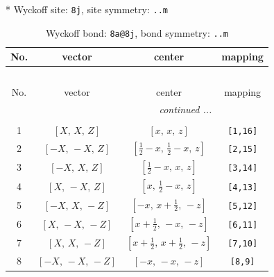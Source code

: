 \documentclass[fleqn,8pt]{jsarticle}
\begin{document}
* Wyckoff site: {\tt 8j}, site symmetry: {\tt ..m}
\renewcommand{\arraystretch}{1.2}
\begin{longtable}{cccc}
\caption{Wyckoff bond: {\tt 8a@8j}, bond symmetry: {\tt ..m}}
 \\
 \hline \hline
No. & vector & center & mapping \\ \hline \endfirsthead

\multicolumn{3}{l}{\tablename\ \thetable{}} \\
 \hline \hline
No. & vector & center & mapping \\ \hline \endhead

 \hline \hline
\multicolumn{3}{r}{\footnotesize\it continued ...} \\ \endfoot

 \hline \hline
\multicolumn{3}{r}{} \\ \endlastfoot

1 & $\left[ X,\, X,\, Z \right]$ & $\left[ x,\, x,\, z \right]$ & {\tt [1,16]} \\ \hline
2 & $\left[ - X,\, - X,\, Z \right]$ & $\left[ \frac{1}{2} - x,\, \frac{1}{2} - x,\, z \right]$ & {\tt [2,15]} \\ \hline
3 & $\left[ - X,\, X,\, Z \right]$ & $\left[ \frac{1}{2} - x,\, x,\, z \right]$ & {\tt [3,14]} \\ \hline
4 & $\left[ X,\, - X,\, Z \right]$ & $\left[ x,\, \frac{1}{2} - x,\, z \right]$ & {\tt [4,13]} \\ \hline
5 & $\left[ - X,\, X,\, - Z \right]$ & $\left[ - x,\, x + \frac{1}{2},\, - z \right]$ & {\tt [5,12]} \\ \hline
6 & $\left[ X,\, - X,\, - Z \right]$ & $\left[ x + \frac{1}{2},\, - x,\, - z \right]$ & {\tt [6,11]} \\ \hline
7 & $\left[ X,\, X,\, - Z \right]$ & $\left[ x + \frac{1}{2},\, x + \frac{1}{2},\, - z \right]$ & {\tt [7,10]} \\ \hline
8 & $\left[ - X,\, - X,\, - Z \right]$ & $\left[ - x,\, - x,\, - z \right]$ & {\tt [8,9]} \\
\end{longtable}
\renewcommand{\arraystretch}{1.2}
\end{document}
